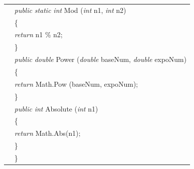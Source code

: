 \begin{program}
\begin{tabular}{>{\codelinenumfont}l>{\codelistingfont}l}
22 &  \hspace{0.4in} \emph{public static int} Mod (\emph{int} n1, \emph{int} n2) \\
23 &  \hspace{0.4in} \{ \\
24 &  \hspace{0.6in} \emph{return} n1 \% n2;  \\
25 &  \hspace{0.4in} \} \\
26 &  \hspace{0.4in} \emph{public double} Power (\emph{double} baseNum, \emph{double} expoNum) \\
27 &  \hspace{0.4in} \{ \\
28 &  \hspace{0.6in} \emph{return} Math.Pow (baseNum, expoNum);  \\
29 &  \hspace{0.4in} \} \\
30 &  \hspace{0.4in} \emph{public int} Absolute (\emph{int} n1) \\
31 &  \hspace{0.4in} \{ \\
32 &  \hspace{0.6in} \emph{return} Math.Abs(n1);  \\
33 &  \hspace{0.4in} \} \\
34 & \hspace{0.2in} \} \\


\end{tabular}
\end{program}
